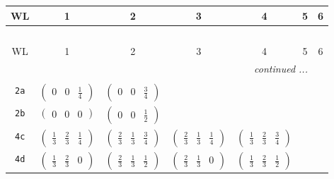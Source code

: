 \documentclass[fleqn,9pt,landscape]{jsarticle}
\begin{document}
\begin{center}
\renewcommand{\arraystretch}{1.2}
\begin{longtable}{ccccccc}
 \hline \hline
WL & 1 & 2 & 3 & 4 & 5 & 6 \\ \hline \endfirsthead

\multicolumn{6}{l}{\tablename\ \thetable{}} \\
 \hline \hline
WL & 1 & 2 & 3 & 4 & 5 & 6 \\ \hline \endhead

 \hline \hline
\multicolumn{6}{r}{\footnotesize\it continued ...} \\ \endfoot

 \hline \hline
\multicolumn{6}{r}{} \\ \endlastfoot

{\tt 2a} & $ \begin{pmatrix} 0 & 0 & \frac{1}{4} \end{pmatrix} $ & $ \begin{pmatrix} 0 & 0 & \frac{3}{4} \end{pmatrix} $ & $  $ & $  $ & $  $ & $  $ \\ \hline
{\tt 2b} & $ \begin{pmatrix} 0 & 0 & 0 \end{pmatrix} $ & $ \begin{pmatrix} 0 & 0 & \frac{1}{2} \end{pmatrix} $ & $  $ & $  $ & $  $ & $  $ \\ \hline
{\tt 4c} & $ \begin{pmatrix} \frac{1}{3} & \frac{2}{3} & \frac{1}{4} \end{pmatrix} $ & $ \begin{pmatrix} \frac{2}{3} & \frac{1}{3} & \frac{3}{4} \end{pmatrix} $ & $ \begin{pmatrix} \frac{2}{3} & \frac{1}{3} & \frac{1}{4} \end{pmatrix} $ & $ \begin{pmatrix} \frac{1}{3} & \frac{2}{3} & \frac{3}{4} \end{pmatrix} $ & $  $ & $  $ \\ \hline
{\tt 4d} & $ \begin{pmatrix} \frac{1}{3} & \frac{2}{3} & 0 \end{pmatrix} $ & $ \begin{pmatrix} \frac{2}{3} & \frac{1}{3} & \frac{1}{2} \end{pmatrix} $ & $ \begin{pmatrix} \frac{2}{3} & \frac{1}{3} & 0 \end{pmatrix} $ & $ \begin{pmatrix} \frac{1}{3} & \frac{2}{3} & \frac{1}{2} \end{pmatrix} $ & $  $ & $  $ \\ \hline

\end{longtable}
\end{center}
\end{document}
